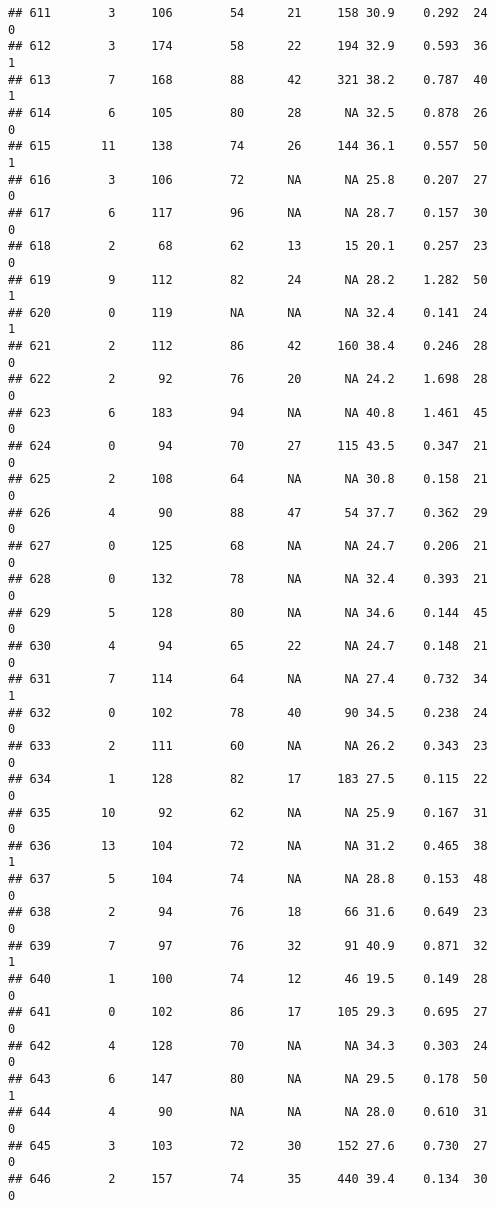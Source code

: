 \documentclass[
]{article}
\begin{document}
\begin{verbatim}
## 611        3     106        54      21     158 30.9    0.292  24    0
## 612        3     174        58      22     194 32.9    0.593  36    1
## 613        7     168        88      42     321 38.2    0.787  40    1
## 614        6     105        80      28      NA 32.5    0.878  26    0
## 615       11     138        74      26     144 36.1    0.557  50    1
## 616        3     106        72      NA      NA 25.8    0.207  27    0
## 617        6     117        96      NA      NA 28.7    0.157  30    0
## 618        2      68        62      13      15 20.1    0.257  23    0
## 619        9     112        82      24      NA 28.2    1.282  50    1
## 620        0     119        NA      NA      NA 32.4    0.141  24    1
## 621        2     112        86      42     160 38.4    0.246  28    0
## 622        2      92        76      20      NA 24.2    1.698  28    0
## 623        6     183        94      NA      NA 40.8    1.461  45    0
## 624        0      94        70      27     115 43.5    0.347  21    0
## 625        2     108        64      NA      NA 30.8    0.158  21    0
## 626        4      90        88      47      54 37.7    0.362  29    0
## 627        0     125        68      NA      NA 24.7    0.206  21    0
## 628        0     132        78      NA      NA 32.4    0.393  21    0
## 629        5     128        80      NA      NA 34.6    0.144  45    0
## 630        4      94        65      22      NA 24.7    0.148  21    0
## 631        7     114        64      NA      NA 27.4    0.732  34    1
## 632        0     102        78      40      90 34.5    0.238  24    0
## 633        2     111        60      NA      NA 26.2    0.343  23    0
## 634        1     128        82      17     183 27.5    0.115  22    0
## 635       10      92        62      NA      NA 25.9    0.167  31    0
## 636       13     104        72      NA      NA 31.2    0.465  38    1
## 637        5     104        74      NA      NA 28.8    0.153  48    0
## 638        2      94        76      18      66 31.6    0.649  23    0
## 639        7      97        76      32      91 40.9    0.871  32    1
## 640        1     100        74      12      46 19.5    0.149  28    0
## 641        0     102        86      17     105 29.3    0.695  27    0
## 642        4     128        70      NA      NA 34.3    0.303  24    0
## 643        6     147        80      NA      NA 29.5    0.178  50    1
## 644        4      90        NA      NA      NA 28.0    0.610  31    0
## 645        3     103        72      30     152 27.6    0.730  27    0
## 646        2     157        74      35     440 39.4    0.134  30    0

\end{verbatim}
\end{document}
